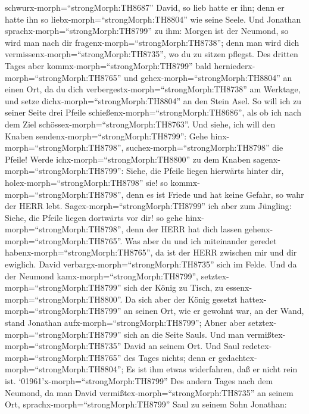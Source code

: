 schwurx-morph=``strongMorph:TH8687'' David, so lieb hatte er ihn; denn
er hatte ihn so liebx-morph=``strongMorph:TH8804'' wie seine Seele.
 Und Jonathan sprachx-morph=``strongMorph:TH8799'' zu ihm:
Morgen ist der Neumond, so wird man nach dir
fragenx-morph=``strongMorph:TH8738''; denn man wird dich
vermissenx-morph=``strongMorph:TH8735'', wo du zu sitzen pflegst.
 Des dritten Tages aber kommx-morph=``strongMorph:TH8799''
bald herniederx-morph=``strongMorph:TH8765'' und
gehex-morph=``strongMorph:TH8804'' an einen Ort, da du dich
verbergestx-morph=``strongMorph:TH8738'' am Werktage, und setze
dichx-morph=``strongMorph:TH8804'' an den Stein Asel.  So
will ich zu seiner Seite drei Pfeile
schießenx-morph=``strongMorph:TH8686'', als ob ich nach dem Ziel
schössex-morph=``strongMorph:TH8763''.  Und siehe, ich will
den Knaben sendenx-morph=``strongMorph:TH8799'': Gehe
hinx-morph=``strongMorph:TH8798'', suchex-morph=``strongMorph:TH8798''
die Pfeile! Werde ichx-morph=``strongMorph:TH8800'' zu dem Knaben
sagenx-morph=``strongMorph:TH8799'': Siehe, die Pfeile liegen hierwärts
hinter dir, holex-morph=``strongMorph:TH8798'' sie! so
kommx-morph=``strongMorph:TH8798'', denn es ist Friede und hat keine
Gefahr, so wahr der HERR lebt. 
Sagex-morph=``strongMorph:TH8799'' ich aber zum Jüngling: Siehe, die
Pfeile liegen dortwärts vor dir! so gehe
hinx-morph=``strongMorph:TH8798'', denn der HERR hat dich lassen
gehenx-morph=``strongMorph:TH8765''.  Was aber du und ich
miteinander geredet habenx-morph=``strongMorph:TH8765'', da ist der HERR
zwischen mir und dir ewiglich.  David
verbargx-morph=``strongMorph:TH8735'' sich im Felde. Und da der Neumond
kamx-morph=``strongMorph:TH8799'', setztex-morph=``strongMorph:TH8799''
sich der König zu Tisch, zu essenx-morph=``strongMorph:TH8800''.
 Da sich aber der König gesetzt
hattex-morph=``strongMorph:TH8799'' an seinen Ort, wie er gewohnt war,
an der Wand, stand Jonathan aufx-morph=``strongMorph:TH8799''; Abner
aber setztex-morph=``strongMorph:TH8799'' sich an die Seite Sauls. Und
man vermißtex-morph=``strongMorph:TH8735'' David an seinem Ort.
 Und Saul redetex-morph=``strongMorph:TH8765'' des Tages
nichts; denn er gedachtex-morph=``strongMorph:TH8804''; Es ist ihm etwas
widerfahren, daß er nicht rein ist. 
`01961'\textbar x-morph=``strongMorph:TH8799'' Des andern Tages nach dem
Neumond, da man David vermißtex-morph=``strongMorph:TH8735'' an seinem
Ort, sprachx-morph=``strongMorph:TH8799'' Saul zu seinem Sohn Jonathan:
